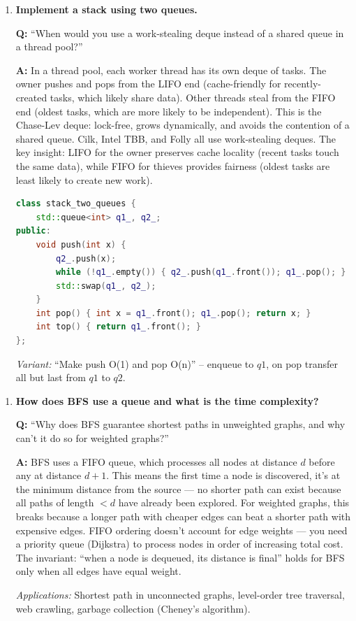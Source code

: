\begin{enumerate}
\item \textbf{Implement a stack using two queues.}

\textbf{Q:} ``When would you use a work-stealing deque instead of a shared queue in a thread pool?''

\textbf{A:} In a thread pool, each worker thread has its own deque of tasks. The owner pushes and pops from the LIFO end (cache-friendly for recently-created tasks, which likely share data). Other threads steal from the FIFO end (oldest tasks, which are more likely to be independent). This is the Chase-Lev deque: lock-free, grows dynamically, and avoids the contention of a shared queue. Cilk, Intel TBB, and Folly all use work-stealing deques. The key insight: LIFO for the owner preserves cache locality (recent tasks touch the same data), while FIFO for thieves provides fairness (oldest tasks are least likely to create new work).

\begin{lstlisting}[language=C++]
class stack_two_queues {
    std::queue<int> q1_, q2_;
public:
    void push(int x) {
        q2_.push(x);
        while (!q1_.empty()) { q2_.push(q1_.front()); q1_.pop(); }
        std::swap(q1_, q2_);
    }
    int pop() { int x = q1_.front(); q1_.pop(); return x; }
    int top() { return q1_.front(); }
};
\end{lstlisting}

\textit{Variant:} ``Make push O(1) and pop O(n)'' -- enqueue to $q1$, on pop transfer all but last from $q1$ to $q2$.
\end{enumerate}

\begin{enumerate}
\item \textbf{How does BFS use a queue and what is the time complexity?}

\textbf{Q:} ``Why does BFS guarantee shortest paths in unweighted graphs, and why can't it do so for weighted graphs?''

\textbf{A:} BFS uses a FIFO queue, which processes all nodes at distance $d$ before any at distance $d+1$. This means the first time a node is discovered, it's at the minimum distance from the source --- no shorter path can exist because all paths of length $< d$ have already been explored. For weighted graphs, this breaks because a longer path with cheaper edges can beat a shorter path with expensive edges. FIFO ordering doesn't account for edge weights --- you need a priority queue (Dijkstra) to process nodes in order of increasing total cost. The invariant: ``when a node is dequeued, its distance is final'' holds for BFS only when all edges have equal weight.

\textit{Applications:} Shortest path in unconnected graphs, level-order tree traversal, web crawling, garbage collection (Cheney's algorithm).
\end{enumerate}

